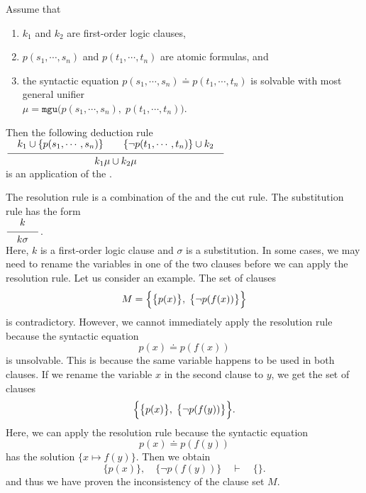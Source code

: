 \begin{Definition}  
    Assume that
    \begin{enumerate}
    \item $k_1$ and $k_2$ are first-order logic clauses,
    \item $p(s_1,\cdots,s_n)$ and $p(t_1,\cdots,t_n)$ are atomic formulas, and
    \item the syntactic equation $p(s_1,\cdots,s_n) \doteq p(t_1,\cdots,t_n)$ is solvable with most general unifier
          \\[0.2cm]
          \hspace*{1.3cm}
          $\mu = \mathtt{mgu}\bigl(p(s_1,\cdots,s_n),\; p(t_1,\cdots,t_n)\bigr)$. 
    \end{enumerate}
     Then the following deduction rule
     \\[0.2cm]
     \hspace*{1.3cm}
     $\schluss{k_1 \cup\{ p(s_1,\cdots,s_n)\} \quad\quad \{\neg p(t_1,\cdots,t_n)\} \cup k_2}{
                 k_1\mu \cup k_2\mu} 
               $
     \\[0.2cm]
     is an application of the .
     \eox
\end{Definition}

The resolution rule is a combination of the  and the cut rule. The substitution rule  has the form
\\[0.2cm]
\hspace*{1.3cm}
$\schluss{k}{k\sigma}$.
\\[0.2cm]
Here, $k$ is a first-order logic clause and $\sigma$ is a substitution.
In some cases, we may need to rename the variables in one of the two clauses before we can apply the resolution rule. Let us consider an example.
The set of clauses
\[ M = \Bigl\{ \bigl\{ p(x) \bigr\},\; \bigl\{ \neg p(f(x)) \bigr\} \Bigr\} \]
is contradictory. However, we cannot immediately apply the resolution rule because the syntactic equation
\[ p(x) \doteq p(f(x)) \]
is unsolvable. This is because the same variable happens to be used in both clauses. If we rename the variable $x$ in the second clause to $y$, we get the set of clauses
\[ \Bigl\{ \bigl\{ p(x) \bigr\},\; \bigl\{ \neg p(f(y)) \bigr\} \Bigr\}. \]
Here, we can apply the resolution rule because the syntactic equation
\[ p(x) \doteq p(f(y)) \]
has the solution $\{ x \mapsto f(y) \}$. Then we obtain
\[ \bigl\{ p(x) \bigr\}, \quad \bigl\{ \neg p(f(y)) \bigr\} \quad \vdash \quad \{\}. \]
and thus we have proven the inconsistency of the clause set $M$.


